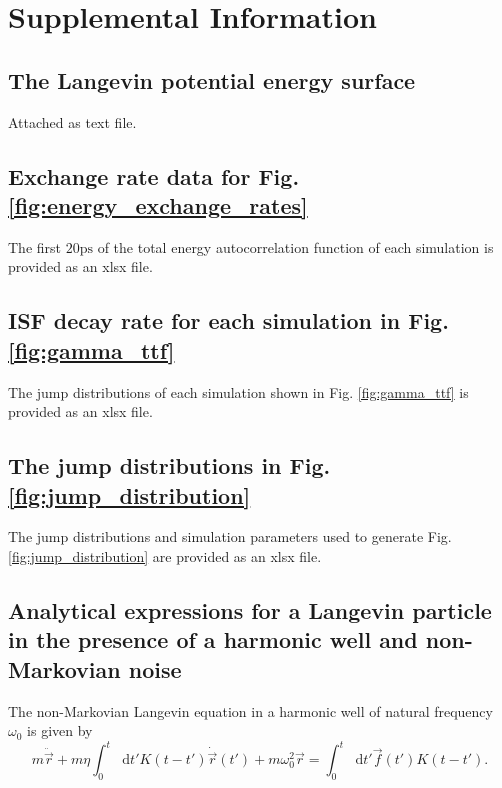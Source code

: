 \documentclass[7pt]{article}
\newcommand*{\diff}{\mathop{}\!\mathrm{d}}
\newcommand{\ps}{\si{\pico\second}}
\begin{document}
\section*{Supplemental Information}

\subsection*{The Langevin potential energy surface}

Attached as text file.

\subsection*{Exchange rate data for Fig. \ref{fig:energy_exchange_rates}}

The first $20\ps$ of the total energy autocorrelation function of each simulation is provided as an xlsx file.

\subsection*{ISF decay rate for each simulation in Fig. \ref{fig:gamma_ttf}}

The jump distributions of each simulation shown in Fig. \ref{fig:gamma_ttf} is provided as an xlsx file.

\subsection*{The jump distributions in Fig. \ref{fig:jump_distribution}}

The jump distributions and simulation parameters used to generate Fig. \ref{fig:jump_distribution} are provided as an xlsx file.

\subsection*{Analytical expressions for a Langevin particle in the presence of a harmonic well and non-Markovian noise}

The non-Markovian Langevin equation in a harmonic well of natural frequency $\omega_0$ is given by
$$
m\ddot{\vec{r}}+m\eta\int_0^t\diff{t'}K(t-t')\dot{\vec{r}}(t')+m\omega_0^2\vec{r}=\int_0^t\diff{t'}\vec{f}(t')K(t-t').
$$
\end{document}
